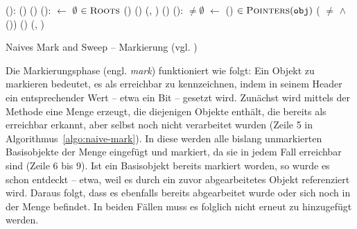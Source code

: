 \begin{algorithm}
\begin{algorithmic}[1]
	\State {}():
	\State \quad {}()
	\State \quad {}()
	\Statex
	\State {}():
	\State \quad {} $\gets$ $\emptyset$				
	\State \quad \FOREACH {} $\in \textsc{Roots}$		
	\State \quad \quad \IF {}()
	\State \quad \quad \quad {}()	
	\State \quad \quad \quad {}(, )	
	\State \quad \quad \quad {}()			
	\Statex
	\State {}():
	\State \quad \WHILE {} $\neq \emptyset$
	\State \quad \quad {} $\gets$ ()			
	\State \quad \quad \FOREACH {} $\in \textsc{Pointers}(\texttt{obj})$	
	\State \quad \quad \quad \IF ( $\neq$ \Null $\wedge$ ())	
	\State \quad \quad \quad \quad {}()	
	\State \quad \quad \quad \quad {}(, )
\end{algorithmic}
\caption[Naives Mark and Sweep -- Markierung]{Naives Mark and Sweep -- Markierung (vgl. \cite[Kap. 2.2]{jones-lins})}
\label{algo:naive-mark}
\end{algorithm}

Die Markierungsphase (engl. \textit{mark}) funktioniert wie folgt:
Ein Objekt zu markieren bedeutet, es als erreichbar zu kennzeichnen, indem in seinem Header ein entsprechender Wert -- etwa ein Bit -- gesetzt wird.
Zunächst wird mittels der Methode  eine Menge  erzeugt, die diejenigen Objekte enthält, die bereits als erreichbar erkannt, aber selbst noch nicht verarbeitet wurden (Zeile 5 in Algorithmus~\ref{algo:naive-mark}).
In diese werden alle bislang unmarkierten Basisobjekte der Menge \Roots eingefügt und markiert, da sie in jedem Fall erreichbar sind (Zeile 6 bis 9).
Ist ein Basisobjekt bereits markiert worden, so wurde es schon entdeckt -- etwa, weil es durch ein zuvor abgearbeitetes Objekt referenziert wird.
Daraus folgt, dass es ebenfalls bereits abgearbeitet wurde oder sich noch in der Menge  befindet.
In beiden Fällen muss es folglich nicht erneut zu  hinzugefügt werden.

